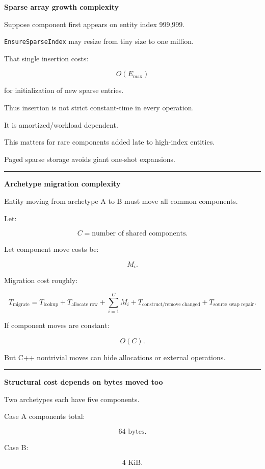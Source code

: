 \textbf{Sparse array growth complexity}

Suppose component first appears on entity index 999,999.

\texttt{EnsureSparseIndex} may resize from tiny size to one million.

That single insertion costs:

\[
O(E_{\max})
\]

for initialization of new sparse entries.

Thus insertion is not strict constant-time in every operation.

It is amortized/workload dependent.

This matters for rare components added late to high-index entities.

Paged sparse storage avoids giant one-shot expansions.

\begin{center}\rule{0.5\linewidth}{0.5pt}\end{center}

\textbf{Archetype migration complexity}

Entity moving from archetype A to B must move all common components.

Let:

\[
C=
\text{number of shared components}.
\]

Let component move costs be:

\[
M_i.
\]

Migration cost roughly:

\[
\boxed{
T_{\text{migrate}}
=
T_{\text{lookup}}
+
T_{\text{allocate row}}
+
\sum_{i=1}^{C}M_i
+
T_{\text{construct/remove changed}}
+
T_{\text{source swap repair}}.
}
\]

If component moves are constant:

\[
O(C).
\]

But C++ nontrivial moves can hide allocations or external operations.

\begin{center}\rule{0.5\linewidth}{0.5pt}\end{center}

\textbf{Structural cost depends on bytes moved too}

Two archetypes each have five components.

Case A components total:

\[
64\text{ bytes}.
\]

Case B:

\[
4\text{ KiB}.
\]

